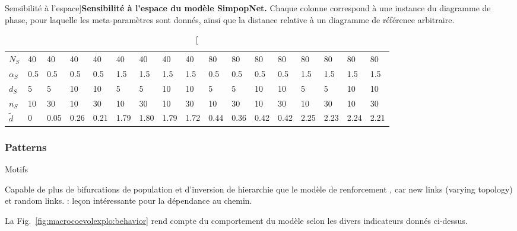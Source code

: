 \begin{table}[!ht]
\caption[Sensibility to space][Sensibilité à l'espace]{}{\textbf{Sensibilité à l'espace du modèle SimpopNet.} Chaque colonne correspond à une instance du diagramme de phase, pour laquelle les meta-paramètres sont donnés, ainsi que la distance relative à un diagramme de référence arbitraire.\label{tab:macrocoevolexplo:spacematters}}
\begin{tabular}{|l|l|l|l|l|l|l|l|l|l|l|l|l|l|l|l|l|}
\hline
$N_S$ & 40 & 40 & 40 & 40 & 40 & 40 & 40 & 40 & 80 & 80 & 80 & 80 & 80 & 80 & 80 & 80\\
$\alpha_S$ & 0.5 & 0.5 & 0.5 & 0.5 & 1.5 & 1.5 & 1.5 & 1.5 & 0.5 & 0.5 & 0.5 & 0.5 & 1.5 & 1.5 & 1.5 & 1.5\\
$d_S$ & 5 & 5 & 10 & 10 & 5 & 5 & 10 & 10 & 5 & 5 & 10 & 10 & 5 & 5 & 10 & 10\\
$n_S$ & 10 & 30 & 10 & 30 & 10 & 30 & 10 & 30 & 10 & 30 & 10 & 30 & 10 & 30 & 10 & 30\\
$\tilde{d}$ & 0 & 0.05 & 0.26 & 0.21 & 1.79 & 1.80 & 1.79 & 1.72 & 0.44 & 0.36 & 0.42 & 0.42 & 2.25 & 2.23 & 2.24 & 2.21\\\hline
\end{tabular}
\end{table}



\subsubsection{Patterns}{Motifs}


Capable de plus de bifurcations de population et d'inversion de hierarchie que le modèle de renforcement , car new links (varying topology) et random links. : leçon intéressante pour la dépendance au chemin. 

La Fig.~\ref{fig:macrocoevolexplo:behavior} rend compte du comportement du modèle selon les divers indicateurs donnés ci-dessus. 


